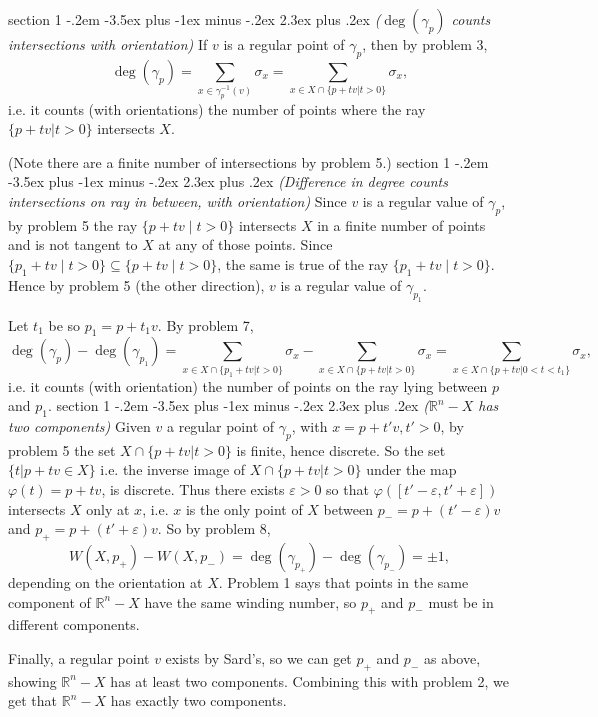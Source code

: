 \documentclass[12pt]{article}
\makeatletter
\theoremstyle{norm}
\newcommand{\R}[0]{\mathbb{R}}
\newcommand{\subeq}[0]{\subseteq}
\newcommand{\ga}[0]{\gamma}
\newcommand{\ep}[0]{\varepsilon}
\newcommand{\ph}[0]{\varphi}
\newcommand{\si}[0]{\sigma}
\newenvironment{problem}{\@startsection
       {section}
       {1}
       {-.2em}
       {-3.5ex plus -1ex minus -.2ex}
       {2.3ex plus .2ex}
       {\pagebreak[3]%
       \large\bf\noindent{Problem }
       }
       }
       {%
       }
\makeatother
\begin{document}
\begin{problem}{\it ($\deg(\ga_p)$ counts intersections with orientation)}
If $v$ is a regular point of $\ga_p$, then  by problem 3,
\[
\deg(\ga_p)=\sum_{x\in \ga_p^{-1}(v)}\si_x=\sum_{x\in X\cap \{p+tv|t>0\}} \si_x,
\]
i.e. it counts (with orientations) the number of points where the ray $\{p+tv|t>0\}$ intersects $X$.

(Note there are a finite number of intersections by problem 5.)
\end{problem}
\begin{problem}{\it (Difference in degree counts intersections on ray in between, with orientation)}
Since $v$ is a regular value of $\ga_p$, by problem 5 the ray $\{p+tv\mid t>0\}$ intersects $X$ in a finite number of points and is not tangent to $X$ at any of those points. Since $\{p_1+tv\mid t>0\}\subeq \{p+tv\mid t>0\}$, the same is true of the ray $\{p_1+tv\mid t>0\}$. Hence by problem 5 (the other direction), $v$ is a regular value of $\ga_{p_1}$.

Let $t_1$ be so $p_1=p+t_1v$.
By problem 7,
\[
\deg(\ga_p)-\deg(\ga_{p_1})=\sum_{x\in X\cap \{p_1+tv|t>0\}} \si_x
-\sum_{x\in X\cap \{p+tv|t>0\}}\si_x=\sum_{x\in X\cap \{p+tv|0<t<t_1\}} \si_x,
\]
i.e. it counts (with orientation) the number of points on the ray lying between $p$ and $p_1$.
\end{problem}
\begin{problem}{\it ($\R^n-X$ has two components)}
Given $v$ a regular point of $\ga_p$, with $x=p+t'v,t'>0$, by problem 5 the set $X\cap \{p+tv|t>0\}$ is finite, hence discrete. So the set $\{t|p+tv\in X\}$ i.e. the inverse image of $X\cap \{p+tv|t>0\}$ under the map $\ph(t)= p+tv$, is discrete. Thus there exists $\ep>0$ so that $\ph([t'-\ep,t'+\ep])$ intersects $X$ only at $x$, i.e. $x$ is the only point of $X$ between $p_-=p+(t'-\ep)v$ and $p_+=p+(t'+\ep)v$. So by problem 8,
\[
W(X,p_+)-W(X,p_-)=\deg(\ga_{p_+})-\deg(\ga_{p_-})=\pm 1,
\]
depending on the orientation at $X$. 
Problem 1 says that points in the same component of $\R^n-X$ have the same winding number, so $p_+$ and $p_-$ must be in different components.

Finally, a regular point $v$ exists by Sard's, so we can get $p_+$ and $p_-$ as above, showing $\R^n-X$ has at least two components. Combining this with problem 2, we get that $\R^n-X$ has exactly two components.
\end{problem}
\end{document}
